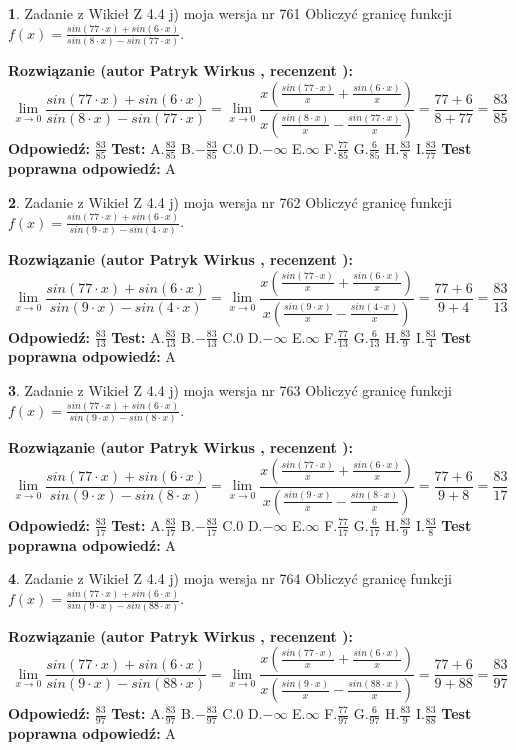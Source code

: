 \documentclass[12pt, a4paper]{article}
\theoremstyle{definition} %
\newtheorem{zad}{}
\newcommand{\zadStart}[1]{\begin{zad}#1\newline}
\newcommand{\zadStop}{\end{zad}}
\newcommand{\rozwStart}[2]{\noindent \textbf{Rozwiązanie (autor #1 , recenzent #2): }\newline}
\newcommand{\rozwStop}{\newline}
\newcommand{\odpStart}{\noindent \textbf{Odpowiedź:}\newline}
\newcommand{\odpStop}{\newline}
\newcommand{\testStart}{\noindent \textbf{Test:}\newline}
\newcommand{\testStop}{\newline}
\newcommand{\kluczStart}{\noindent \textbf{Test poprawna odpowiedź:}\newline}
\newcommand{\kluczStop}{\newline}
\begin{document}
\zadStart{Zadanie z Wikieł Z 4.4 j) moja wersja nr 761}
Obliczyć granicę funkcji $f(x)=\frac{sin(77\cdot x) +sin(6\cdot x)}{sin(8\cdot x) -sin(77\cdot x)}$.
\zadStop
\rozwStart{Patryk Wirkus}{}
$$\lim\limits_{x\to 0}\frac{sin(77\cdot x) +sin(6\cdot x)}{sin(8\cdot x) -sin(77\cdot x)}=\lim\limits_{x\to 0}\frac{x(\frac{sin(77\cdot x)}{x}+\frac{sin(6\cdot x)}{x})}{x(\frac{sin(8\cdot x)}{x}-\frac{sin(77\cdot x)}{x})}=\frac{77+6}{8+77} = \frac{83}{85}$$
\rozwStop
\odpStart
$\frac{83}{85}$
\odpStop
\testStart
A.$\frac{83}{85}$
B.$-\frac{83}{85}$
C.$0$
D.$-\infty$
E.$\infty$
F.$\frac{77}{85}$
G.$\frac{6}{85}$
H.$\frac{83}{8}$
I.$\frac{83}{77}$
\testStop
\kluczStart
A
\kluczStop



\zadStart{Zadanie z Wikieł Z 4.4 j) moja wersja nr 762}
Obliczyć granicę funkcji $f(x)=\frac{sin(77\cdot x) +sin(6\cdot x)}{sin(9\cdot x) -sin(4\cdot x)}$.
\zadStop
\rozwStart{Patryk Wirkus}{}
$$\lim\limits_{x\to 0}\frac{sin(77\cdot x) +sin(6\cdot x)}{sin(9\cdot x) -sin(4\cdot x)}=\lim\limits_{x\to 0}\frac{x(\frac{sin(77\cdot x)}{x}+\frac{sin(6\cdot x)}{x})}{x(\frac{sin(9\cdot x)}{x}-\frac{sin(4\cdot x)}{x})}=\frac{77+6}{9+4} = \frac{83}{13}$$
\rozwStop
\odpStart
$\frac{83}{13}$
\odpStop
\testStart
A.$\frac{83}{13}$
B.$-\frac{83}{13}$
C.$0$
D.$-\infty$
E.$\infty$
F.$\frac{77}{13}$
G.$\frac{6}{13}$
H.$\frac{83}{9}$
I.$\frac{83}{4}$
\testStop
\kluczStart
A
\kluczStop



\zadStart{Zadanie z Wikieł Z 4.4 j) moja wersja nr 763}
Obliczyć granicę funkcji $f(x)=\frac{sin(77\cdot x) +sin(6\cdot x)}{sin(9\cdot x) -sin(8\cdot x)}$.
\zadStop
\rozwStart{Patryk Wirkus}{}
$$\lim\limits_{x\to 0}\frac{sin(77\cdot x) +sin(6\cdot x)}{sin(9\cdot x) -sin(8\cdot x)}=\lim\limits_{x\to 0}\frac{x(\frac{sin(77\cdot x)}{x}+\frac{sin(6\cdot x)}{x})}{x(\frac{sin(9\cdot x)}{x}-\frac{sin(8\cdot x)}{x})}=\frac{77+6}{9+8} = \frac{83}{17}$$
\rozwStop
\odpStart
$\frac{83}{17}$
\odpStop
\testStart
A.$\frac{83}{17}$
B.$-\frac{83}{17}$
C.$0$
D.$-\infty$
E.$\infty$
F.$\frac{77}{17}$
G.$\frac{6}{17}$
H.$\frac{83}{9}$
I.$\frac{83}{8}$
\testStop
\kluczStart
A
\kluczStop



\zadStart{Zadanie z Wikieł Z 4.4 j) moja wersja nr 764}
Obliczyć granicę funkcji $f(x)=\frac{sin(77\cdot x) +sin(6\cdot x)}{sin(9\cdot x) -sin(88\cdot x)}$.
\zadStop
\rozwStart{Patryk Wirkus}{}
$$\lim\limits_{x\to 0}\frac{sin(77\cdot x) +sin(6\cdot x)}{sin(9\cdot x) -sin(88\cdot x)}=\lim\limits_{x\to 0}\frac{x(\frac{sin(77\cdot x)}{x}+\frac{sin(6\cdot x)}{x})}{x(\frac{sin(9\cdot x)}{x}-\frac{sin(88\cdot x)}{x})}=\frac{77+6}{9+88} = \frac{83}{97}$$
\rozwStop
\odpStart
$\frac{83}{97}$
\odpStop
\testStart
A.$\frac{83}{97}$
B.$-\frac{83}{97}$
C.$0$
D.$-\infty$
E.$\infty$
F.$\frac{77}{97}$
G.$\frac{6}{97}$
H.$\frac{83}{9}$
I.$\frac{83}{88}$
\testStop
\kluczStart
A
\kluczStop
\end{document}
